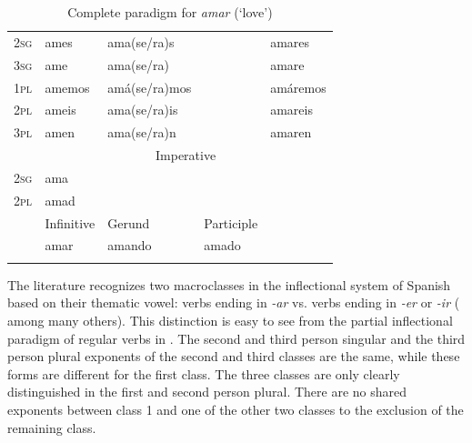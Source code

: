 \begin{table}
\begin{tabular}{lllll}
    \textsc{2sg} & ames                & ama(se/ra)s        &                    & amares          \\
    \textsc{3sg} & ame                 & ama(se/ra)         &                    & amare           \\
    \textsc{1pl} & amemos              & amá(se/ra)mos      &                    & amáremos        \\
    \textsc{2pl} & ameis               & ama(se/ra)is       &                    & amareis         \\
    \textsc{3pl} & amen                & ama(se/ra)n        &                    & amaren          \\
    \midrule
        & \multicolumn{4}{c}{Imperative}                                                  \\
    \textsc{2sg} & ama                                                                             \\
    \textsc{2pl} & amad                                                                            \\
    \midrule
        & {Infinitive} & {Gerund}    & {Participle}                  \\
        & amar                & amando             & amado                                \\
    \lspbottomrule
  \end{tabular}\caption{Complete paradigm for \textit{amar} (`love')}\label{tab:conj-sp}
\end{table}

The literature recognizes two macroclasses in the inflectional system of Spanish based on their thematic vowel: verbs ending in \textit{-ar} vs. verbs ending in \textit{-er} or \textit{-ir} (\citealt{Aguirre.2008} among many others). This distinction is easy to see from the partial inflectional paradigm of regular verbs in .
The second and third person singular and the third person plural exponents of the second and third classes are the same, while these forms are different for the first class. The three classes are only clearly distinguished in the first and second person plural. There are no shared exponents between class 1 and one of the other two classes to the exclusion of the remaining class.


